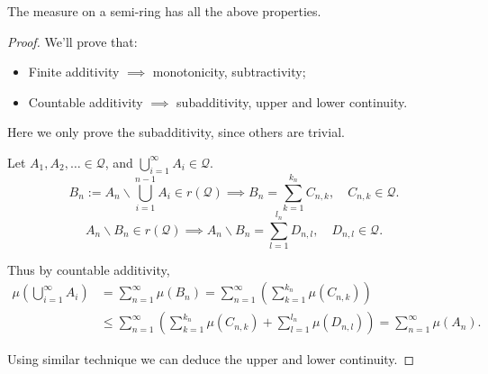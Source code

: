 \begin{theorem}
    The measure on a semi-ring has all the above properties.
\end{theorem}
\begin{proof}[Proof]
    We'll prove that:
	\begin{itemize}
		\item Finite additivity $ \implies $ monotonicity, subtractivity;
		\item Countable additivity $\implies$ subadditivity, upper and lower continuity.
	\end{itemize}

	Here we only prove the subadditivity, since others are trivial.

	Let $A_1,A_2,\dots\in \mathscr{Q}$, and $\bigcup_{i=1}^\infty A_i\in \mathscr{Q}$.
	\[
	B_n := A_n \backslash \bigcup_{i=1}^{n-1} A_i \in r(\mathscr{Q})
	\implies B_n = \sum_{k=1}^{k_n} C_{n,k},\quad C_{n,k}\in \mathscr{Q}.
	\]
	\[
	A_n \backslash B_n \in r(\mathscr{Q}) \implies
	A_n \backslash B_n = \sum_{l=1}^{l_n} D_{n,l},\quad D_{n,l}\in \mathscr{Q}.
	\]
	
	Thus by countable additivity,
	\begin{align*}
		\mu\left(\bigcup_{i=1}^\infty A_i\right) &= \sum_{n=1}^{\infty} \mu(B_n)
		= \sum_{n=1}^{\infty}\left( \sum_{k=1}^{k_n} \mu(C_{n,k}) \right)\\
		&\le \sum_{n=1}^{\infty}\left( \sum_{k=1}^{k_n} \mu(C_{n,k})+ \sum_{l=1}^{l_n}\mu(D_{n,l}) \right)
		= \sum_{n=1}^{\infty} \mu(A_n). 
	\end{align*}
	
	Using similar technique we can deduce the upper and lower continuity.
\end{proof}

